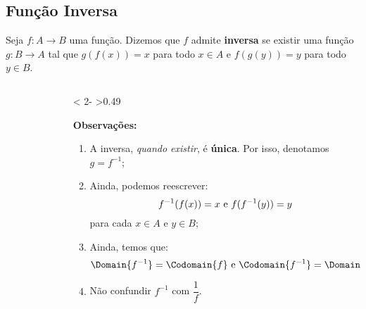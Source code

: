 \subsection{Função Inversa}
\begin{frame}
  \begin{definition}
    Seja $f:A\rightarrow B$ uma função. Dizemos que $f$ admite \textbf{inversa} se existir uma função $g:B\rightarrow A$ tal que $g(f(x)) = x$ para todo $x\in A$ e $f(g(y))=y$ para todo $y\in B$.
  \end{definition}
  \begin{columns}[onlytextwidth]
    \begin{column}{0.49\textwidth}
      \begin{figure}
      \end{figure}
    \end{column}
    \begin{column}< 2- >{0.49\textwidth}
      \begin{highlight}
        \textbf{Observações:}
        \begin{enumerate}
          \item A inversa, \emph{quando existir}, é \textbf{única}. Por isso, denotamos $ g=f^{-1}$;
          \item<3> Ainda, podemos reescrever:\vspace*{-0.3cm}
          \begin{equation*}
            f^{-1}(f(x)) = x\mbox{ e }f(f^{-1}(y)) = y\vspace*{-0.3cm}
          \end{equation*}
          para cada $x\in A$ e $y\in B$;
          \item<3> Ainda, temos que:\vspace*{-0.3cm}
          \begin{equation*}
            \Domain{f^{-1}} = \Codomain{f}\mbox{ e }\Codomain{f^{-1}} = \Domain{f};\vspace*{-0.3cm}
          \end{equation*}
          \item<3> Não confundir $f^{-1}$ com $\dfrac{1}{f}$.
        \end{enumerate}
      \end{highlight}
    \end{column}
  \end{columns}
\end{frame}

